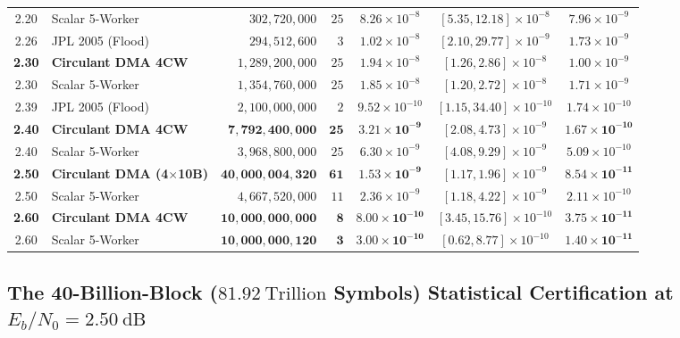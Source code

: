 \documentclass[10pt]{article}
\begin{document}
\begin{table}[!htbp]
{\begin{tabular}{@{}c l r r c c c@{}}
2.20 & Scalar 5-Worker & $302,720,000$ & $25$ & $8.26 \times 10^{-8}$ & $[5.35, 12.18] \times 10^{-8}$ & $7.96 \times 10^{-9}$ \\
2.26 & JPL 2005 (Flood) & $294,512,600$ & $3$ & $1.02 \times 10^{-8}$ & $[2.10, 29.77] \times 10^{-9}$ & $1.73 \times 10^{-9}$ \\
\midrule
\textbf{2.30} & \textbf{Circulant DMA 4CW} & $1,289,200,000$ & $25$ & $1.94 \times 10^{-8}$ & $[1.26, 2.86] \times 10^{-8}$ & $1.00 \times 10^{-9}$ \\
2.30 & Scalar 5-Worker & $1,354,760,000$ & $25$ & $1.85 \times 10^{-8}$ & $[1.20, 2.72] \times 10^{-8}$ & $1.71 \times 10^{-9}$ \\
2.39 & JPL 2005 (Flood) & $2,100,000,000$ & $2$ & $9.52 \times 10^{-10}$ & $[1.15, 34.40] \times 10^{-10}$ & $1.74 \times 10^{-10}$ \\
\midrule
\textbf{2.40} & \textbf{Circulant DMA 4CW} & $\mathbf{7,792,400,000}$ & $\mathbf{25}$ & $\mathbf{3.21 \times 10^{-9}}$ & $[2.08, 4.73] \times 10^{-9}$ & $\mathbf{1.67 \times 10^{-10}}$ \\
2.40 & Scalar 5-Worker & $3,968,800,000$ & $25$ & $6.30 \times 10^{-9}$ & $[4.08, 9.29] \times 10^{-9}$ & $5.09 \times 10^{-10}$ \\
\midrule
\textbf{2.50} & \textbf{Circulant DMA (4$\times$10B)} & $\mathbf{40,000,004,320}$ & $\mathbf{61}$ & $\mathbf{1.53 \times 10^{-9}}$ & $[1.17, 1.96] \times 10^{-9}$ & $\mathbf{8.54 \times 10^{-11}}$ \\
2.50 & Scalar 5-Worker & $4,667,520,000$ & $11$ & $2.36 \times 10^{-9}$ & $[1.18, 4.22] \times 10^{-9}$ & $2.11 \times 10^{-10}$ \\
\midrule
\textbf{2.60} & \textbf{Circulant DMA 4CW} & $\mathbf{10,000,000,000}$ & $\mathbf{8}$ & $\mathbf{8.00 \times 10^{-10}}$ & $[3.45, 15.76] \times 10^{-10}$ & $\mathbf{3.75 \times 10^{-11}}$ \\
2.60 & Scalar 5-Worker & $\mathbf{10,000,000,120}$ & $\mathbf{3}$ & $\mathbf{3.00 \times 10^{-10}}$ & $[0.62, 8.77] \times 10^{-10}$ & $\mathbf{1.40 \times 10^{-11}}$ \\
\bottomrule
\end{tabular}%
}
\end{table}

\subsection{The 40-Billion-Block ($81.92\ \mathrm{Trillion}$ Symbols) Statistical Certification at $E_b/N_0 = 2.50\ \mathrm{dB}$}
\end{document}

